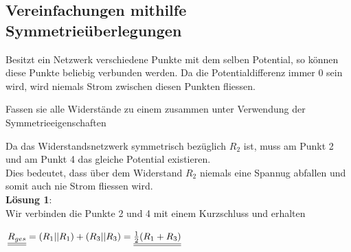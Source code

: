 \newpage


\subsection{Vereinfachungen mithilfe Symmetrieüberlegungen}

Besitzt ein Netzwerk verschiedene Punkte mit dem selben Potential, so können diese Punkte beliebig verbunden werden.
Da die Potentialdifferenz immer 0 sein wird, wird niemals Strom zwischen diesen Punkten fliessen.

\beginbsp
Fassen sie alle Widerstände zu einem zusammen unter Verwendung der Symmetrieeigenschaften
\begin{center}
\end{center}
\iend

\beginbsp
Da das Widerstandsnetzwerk symmetrisch bezüglich $R_2$ ist, muss am Punkt 2 und am Punkt 4 das gleiche Potential existieren. \\
Dies bedeutet, dass über dem Widerstand $R_2$ niemals eine Spannug abfallen und somit auch nie Strom fliessen wird. \\
\textbf{Lösung 1}: \\
Wir verbinden die Punkte 2 und 4 mit einem Kurzschluss und erhalten
\begin{center}
	$\underline{\underline{R_{ges}}} = (R_1 || R_1) + (R_3 || R_3) = \underline{\underline{\frac{1}{2}(R_1 + R_3)}}$
\end{center}

